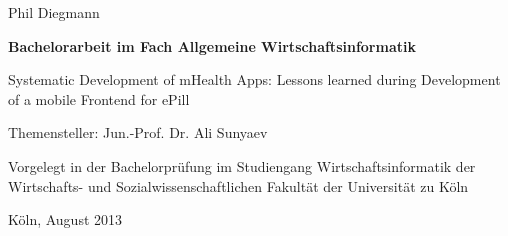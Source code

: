 \vspace*{1mm}

\thispagestyle{empty}
Phil Diegmann

\vspace*{23mm}

\begin{center}
\textbf{
    Bachelorarbeit
\linebreak
    im Fach Allgemeine Wirtschaftsinformatik}
\end{center}

\vspace*{20mm}

\begin{center}
\LARGE 
    Systematic Development of mHealth Apps: Lessons learned during Development of a mobile Frontend for ePill
\end{center}

\vspace*{8mm}

\begin{center}
    Themensteller: Jun.-Prof. Dr. Ali Sunyaev
\end{center}

\vspace*{12mm}

\begin{center}
    Vorgelegt in der Bachelorprüfung
\linebreak
    im Studiengang Wirtschaftsinformatik
\linebreak
    der Wirtschafts- und Sozialwissenschaftlichen Fakultät
\linebreak
    der Universität zu Köln
\end{center}

\vspace*{30mm}

\begin{center}
Köln, August 2013
\end{center}